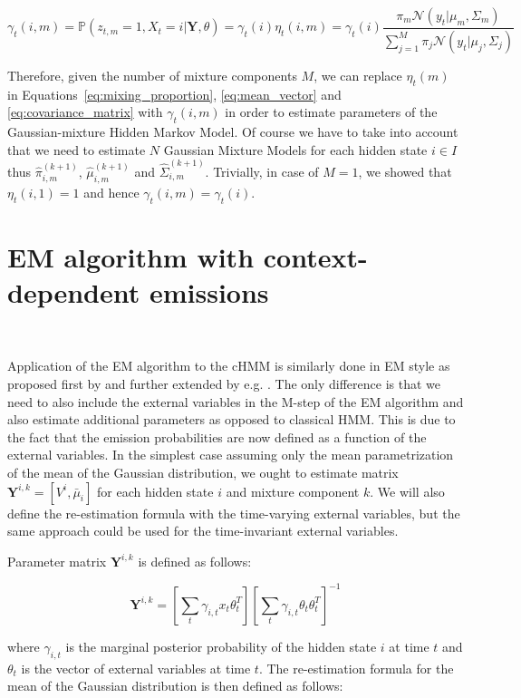 \begin{equation}
    \gamma_t(i,m) = \mathbb{P}(z_{t,m} = 1, X_t = i|\textbf{Y},\theta) = \gamma_t(i) \eta_t(i,m) = \gamma_t(i) \frac{\pi_m \mathcal{N}(y_t|\mu_m,\Sigma_m)}{\sum_{j=1}^{M} \pi_j \mathcal{N}(y_t|\mu_j,\Sigma_j)}
\end{equation}

Therefore, given the number of mixture components $M$, we can replace $\eta_t(m)$ in Equations~\ref{eq:mixing_proportion}, \ref{eq:mean_vector} and \ref{eq:covariance_matrix} 
with $\gamma_t(i,m)$ in order to estimate parameters of the Gaussian-mixture Hidden Markov Model. Of course we have to take into account that we need to estimate $N$ Gaussian Mixture Models
for each hidden state $i \in I$ thus $\hat{\pi}_{i,m}^{(k+1)}$, $\hat{\mu}_{i,m}^{(k+1)}$ and $\hat{\Sigma}_{i,m}^{(k+1)}$.
Trivially, in case of $M = 1$, we showed that $\eta_t(i,1) = 1$ and hence $\gamma_t(i,m) = \gamma_t(i)$. 

\section{EM algorithm with context-dependent emissions}~\label{sec:EM-cHMM}

Application of the EM algorithm to the cHMM is similarly done in EM style as proposed first by \citep{Bobick1999} and further extended by e.g. \citep{Radenen2014}. 
The only difference is that we need to also include the external variables in the 
M-step of the EM algorithm and also estimate additional parameters as opposed to classical HMM. This is due to the fact that the emission probabilities
are now defined as a function of the external variables. In the simplest case assuming only the mean parametrization of the mean of the Gaussian distribution,
we ought to estimate matrix $\textbf{Y}^{i,k} = [V^i,\bar{\mu}_i]$ for each hidden state $i$ and mixture component $k$. We will also define the re-estimation formula 
with the time-varying external variables, but the same approach could be used for the time-invariant external variables. \citep{Radenen2014}

Parameter matrix $\textbf{Y}^{i,k}$ is defined as follows:

\begin{equation}
    \textbf{Y}^{i,k} = \left[\sum_{t} \gamma_{i,t} x_t \theta_t^T\right] \left[ \sum_{t} \gamma_{i,t} \theta_t \theta_t^T \right]^{-1}
\end{equation}

where $\gamma_{i,t}$ is the marginal posterior probability of the hidden state $i$ at time $t$ and $\theta_t$ is the vector of external variables at time $t$.
The re-estimation formula for the mean of the Gaussian distribution is then defined as follows:

